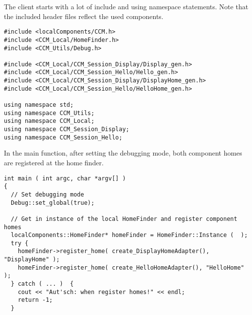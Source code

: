 \noindent
The client starts with a lot of include and using namespace statements. Note
that the included header files reflect the used components.
\begin{small}
\begin{verbatim}
#include <localComponents/CCM.h>
#include <CCM_Local/HomeFinder.h>
#include <CCM_Utils/Debug.h>

#include <CCM_Local/CCM_Session_Display/Display_gen.h>
#include <CCM_Local/CCM_Session_Hello/Hello_gen.h>
#include <CCM_Local/CCM_Session_Display/DisplayHome_gen.h>
#include <CCM_Local/CCM_Session_Hello/HelloHome_gen.h>

using namespace std;
using namespace CCM_Utils;
using namespace CCM_Local;
using namespace CCM_Session_Display;
using namespace CCM_Session_Hello;
\end{verbatim}
\end{small}

\noindent
In the main function, after setting the debugging mode, both component homes are
registered at the home finder.
\begin{small}
\begin{verbatim}
int main ( int argc, char *argv[] )
{
  // Set debugging mode
  Debug::set_global(true);

  // Get in instance of the local HomeFinder and register component homes
  localComponents::HomeFinder* homeFinder = HomeFinder::Instance (  );
  try {                       
    homeFinder->register_home( create_DisplayHomeAdapter(), "DisplayHome" );
    homeFinder->register_home( create_HelloHomeAdapter(), "HelloHome" );
  } catch ( ... )  {
    cout << "Aut'sch: when register homes!" << endl;
    return -1;
  }
\end{verbatim}
\end{small}

